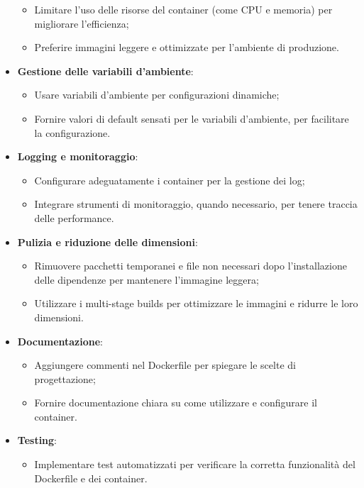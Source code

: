 \begin{itemize}
    \begin{itemize}
        \item Limitare l'uso delle risorse del container (come CPU e memoria) per migliorare l'efficienza;
        \item Preferire immagini leggere e ottimizzate per l'ambiente di produzione.
    \end{itemize}
    \item \textbf{Gestione delle variabili d'ambiente}:
    \begin{itemize}
        \item Usare variabili d'ambiente per configurazioni dinamiche;
        \item Fornire valori di default sensati per le variabili d'ambiente, per facilitare la configurazione.
    \end{itemize}
    \item \textbf{Logging e monitoraggio}:
    \begin{itemize}
        \item Configurare adeguatamente i container per la gestione dei log;
        \item Integrare strumenti di monitoraggio, quando necessario, per tenere traccia delle performance.
    \end{itemize}
    \item \textbf{Pulizia e riduzione delle dimensioni}:
    \begin{itemize}
        \item Rimuovere pacchetti temporanei e file non necessari dopo l'installazione delle dipendenze per mantenere l'immagine leggera;
        \item Utilizzare i multi-stage builds per ottimizzare le immagini e ridurre le loro dimensioni.
    \end{itemize}
    \item \textbf{Documentazione}:
    \begin{itemize}
        \item Aggiungere commenti nel Dockerfile per spiegare le scelte di progettazione;
        \item Fornire documentazione chiara su come utilizzare e configurare il container.
    \end{itemize}
    \item \textbf{Testing}:
    \begin{itemize}
        \item Implementare test automatizzati per verificare la corretta funzionalità del Dockerfile e dei container.
    \end{itemize}
\end{itemize}

